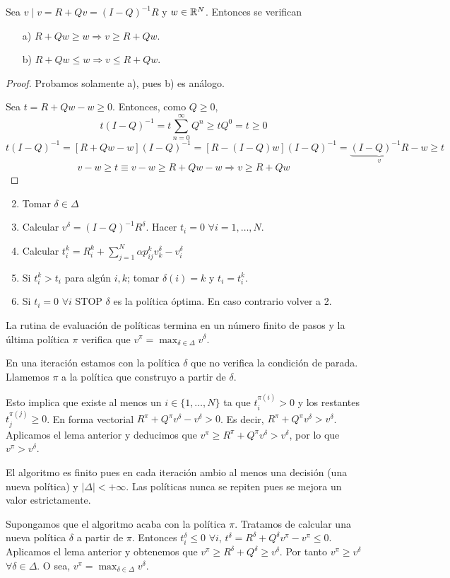 \documentclass[MIOP.tex]{subfiles}
\begin{document}
\begin{lemma}
Sea $v\mid v=R+Qv=(I-Q)^{-1}R$ y $w\in\mathbb{R}^N$. Entonces se verifican
\begin{itemize}
\item[a)] $R+Qw\geq w\Rightarrow v\geq R+Qw$.
\item[b)] $R+Qw\leq w\Rightarrow v\leq R+Qw$.
\end{itemize} 
\end{lemma}
\begin{proof}
Probamos solamente a), pues b) es análogo. 

Sea $t=R+Qw-w\geq 0$. Entonces, como $Q\geq 0$,
$$t(I-Q)^{-1}=t\sum_{n=0}^\infty Q^n\geq tQ^0=t\geq 0$$
$$t(I-Q)^{-1}=[R+Qw-w](I-Q)^{-1}=[R-(I-Q)w](I-Q)^{-1}=\underbrace{(I-Q)^{-1}R}_{v}-w\geq t$$
$$v-w\geq t\equiv v-w\geq R+Qw-w\Rightarrow v\geq R+Qw$$
\end{proof}
\begin{defi}
\begin{enumerate}
\item[]
\item Tomar $\delta \in \Delta$
\item Calcular $v^\delta = (I-Q)^{-1}R^\delta$. Hacer $t_i =0$ $\forall i=1,\dotsc,N$.
\item Calcular $t_i^k= R_i^k + \sum_{j=1}^N \alpha p_{ij}^k v_k^\delta - v_i^\delta$
\item Si $t_i^k > t_i$ para algún $i,k$; tomar $\delta(i)=k$ y $t_i = t^k_i$.
\item Si $t_i = 0$ $\forall i$ STOP $\delta$ es la política óptima. En caso contrario volver a 2.
\end{enumerate}
\end{defi}
\begin{teorema}
La rutina de evaluación de políticas termina en un número finito de pasos y la última política $\pi$ verifica que $v^\pi = \max_{\delta \in \Delta} v^\delta$.
\end{teorema}
\begin{dem}
En una iteración estamos con la política $\delta$ que no verifica la condición de parada. Llamemos $\pi$ a la política que construyo a partir de $\delta$. 

Esto implica que existe al menos un $i\in\{1,\dotsc,N\}$ ta que $t_i^{\pi(i)}>0$ y los restantes $t_j^{\pi(j)}\geq 0$. En forma vectorial $R^\pi+Q^\pi v^\delta - v^\delta > 0$. Es decir, $R^\pi + Q^\pi v^\delta > v^\delta$. Aplicamos el lema anterior y deducimos que $v^\pi \geq R^\pi + Q^\pi v^\delta > v^\delta$, por lo que $v^\pi > v^\delta$.

El algoritmo es finito pues en cada iteración ambio al menos una decisión (una nueva política) y $|\Delta|<+\infty$. Las políticas nunca se repiten pues se mejora un valor estrictamente.

 Supongamos que el algoritmo acaba con la política $\pi$. Tratamos de calcular una nueva política $\delta$ a partir de $\pi$. Entonces $t_i^\delta \leq 0$ $\forall i$, $t^\delta = R^\delta + Q^\delta v^\pi - v^\pi\leq 0$. Aplicamos el lema anterior y obtenemos que $v^\pi \geq R^\delta+Q^\delta \geq v^\delta$. Por tanto $v^\pi \geq v^\delta$ $\forall \delta \in \Delta$. O sea, $v^\pi = \max_{\delta \in \Delta}v^\delta$.
\end{dem}
\end{document}
